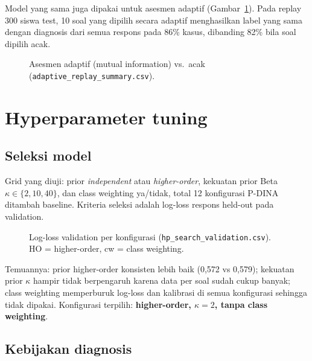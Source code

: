\documentclass[11pt,a4paper]{article}
\begin{document}
Model yang sama juga dipakai untuk asesmen adaptif (Gambar~\ref{fig:adaptif}). Pada replay 300 siswa test, 10 soal
yang dipilih secara adaptif menghasilkan label yang sama dengan diagnosis dari semua respons pada 86\% kasus,
dibanding 82\% bila soal dipilih acak.

\begin{figure}[h]
  \centering
  \setlength\figH{4.6cm}
  \begin{minipage}{0.6\linewidth}\end{minipage}
  \caption{Asesmen adaptif (mutual information) vs.\ acak (\texttt{adaptive\_replay\_summary.csv}).}
  \label{fig:adaptif}
\end{figure}

\section{Hyperparameter tuning}

\subsection{Seleksi model}

Grid yang diuji: prior \emph{independent} atau \emph{higher-order}, kekuatan prior Beta $\kappa\in\{2,10,40\}$, dan
class weighting ya/tidak, total 12 konfigurasi P-DINA ditambah baseline. Kriteria seleksi adalah log-loss respons
held-out pada validation.

\begin{figure}[h]
  \centering
  \setlength\figH{6.2cm}
  \begin{minipage}{0.8\linewidth}\end{minipage}
  \caption{Log-loss validation per konfigurasi (\texttt{hp\_search\_validation.csv}). HO = higher-order,
  cw = class weighting.}
\end{figure}

Temuannya: prior higher-order konsisten lebih baik (0,572 vs 0,579); kekuatan prior $\kappa$ hampir tidak berpengaruh
karena data per soal sudah cukup banyak; class weighting memperburuk log-loss dan kalibrasi di semua konfigurasi
sehingga tidak dipakai. Konfigurasi terpilih: \textbf{higher-order, $\kappa=2$, tanpa class weighting}.

\subsection{Kebijakan diagnosis}
\end{document}
